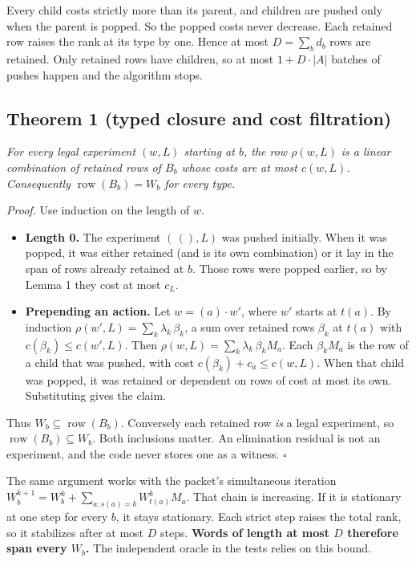 \documentclass[
  11pt,
  a4paper,
]{report}
\providecommand{\tightlist}{%
  \setlength{\itemsep}{0pt}\setlength{\parskip}{0pt}}
\begin{document}
Every child costs strictly more than its parent, and children are pushed
only when the parent is popped. So the popped costs never decrease. Each
retained row raises the rank at its type by one. Hence at most
\(D=\sum_b d_b\) rows are retained. Only retained rows have children, so
at most \(1+D\cdot|A|\) batches of pushes happen and the algorithm
stops.

\hypertarget{theorem-1-typed-closure-and-cost-filtration}{%
\subsection{Theorem 1 (typed closure and cost
filtration)}\label{theorem-1-typed-closure-and-cost-filtration}}

\emph{For every legal experiment \((w,L)\) starting at \(b\), the row
\(\rho(w,L)\) is a linear combination of retained rows of \(B_b\) whose
costs are at most \(c(w,L)\). Consequently
\(\operatorname{row}(B_b)=W_b\) for every type.}

\emph{Proof.} Use induction on the length of \(w\).

\begin{itemize}
\tightlist
\item
  \textbf{Length 0.} The experiment \((\,(),L)\) was pushed initially.
  When it was popped, it was either retained (and is its own
  combination) or it lay in the span of rows already retained at \(b\).
  Those rows were popped earlier, so by Lemma 1 they cost at most
  \(c_L\).
\item
  \textbf{Prepending an action.} Let \(w=(a)\cdot w'\), where \(w'\)
  starts at \(t(a)\). By induction
  \(\rho(w',L)=\sum_k\lambda_k\,\beta_k\), a sum over retained rows
  \(\beta_k\) at \(t(a)\) with \(c(\beta_k)\le c(w',L)\). Then
  \(\rho(w,L)=\sum_k\lambda_k\,\beta_kM_a\). Each \(\beta_kM_a\) is the
  row of a child that was pushed, with cost
  \(c(\beta_k)+c_a\le c(w,L)\). When that child was popped, it was
  retained or dependent on rows of cost at most its own. Substituting
  gives the claim.
\end{itemize}

Thus \(W_b\subseteq\operatorname{row}(B_b)\). Conversely each retained
row \emph{is} a legal experiment, so
\(\operatorname{row}(B_b)\subseteq W_b\). Both inclusions matter. An
elimination residual is not an experiment, and the code never stores one
as a witness. \(\square\)

The same argument works with the packet's simultaneous iteration
\(W_b^{k+1}=W_b^k+\sum_{a:s(a)=b}W^k_{t(a)}M_a\). That chain is
increasing. If it is stationary at one step for every \(b\), it stays
stationary. Each strict step raises the total rank, so it stabilizes
after at most \(D\) steps. \textbf{Words of length at most \(D\)
therefore span every \(W_b\).} The independent oracle in the tests
relies on this bound.
\end{document}
